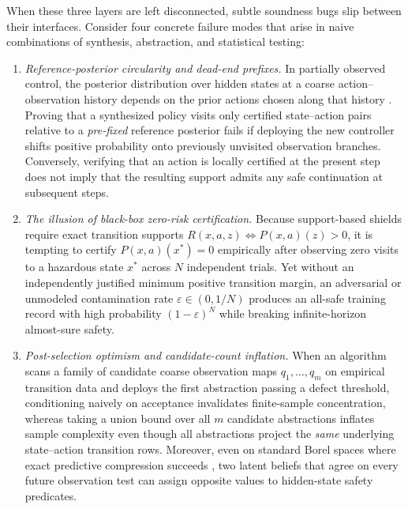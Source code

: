 \documentclass[11pt,a4paper]{article}
\providecommand{\tightlist}{\setlength{\itemsep}{2pt}\setlength{\parskip}{0pt}}
\begin{document}
When these three layers are left disconnected, subtle soundness bugs
slip between their interfaces. Consider four concrete failure modes that
arise in naive combinations of synthesis, abstraction, and statistical
testing:

\begin{enumerate}
\def\labelenumi{\arabic{enumi}.}
\tightlist
\item
  \emph{Reference-posterior circularity and dead-end prefixes.} In
  partially observed control, the posterior distribution over hidden
  states at a coarse action--observation history depends on the prior
  actions chosen along that history
  \citep{astrom1965, smallwoodSondik1973, kaelbling1998}. Proving that a
  synthesized policy visits only certified state--action pairs relative
  to a \emph{pre-fixed} reference posterior fails if deploying the new
  controller shifts positive probability onto previously unvisited
  observation branches. Conversely, verifying that an action is locally
  certified at the present step does not imply that the resulting
  support admits any safe continuation at subsequent steps.
\item
  \emph{The illusion of black-box zero-risk certification.} Because
  support-based shields require exact transition supports
  \(R(x,a,z) \iff P(x,a)(z) > 0\), it is tempting to certify
  \(P(x,a)(x^*) = 0\) empirically after observing zero visits to a
  hazardous state \(x^*\) across \(N\) independent trials. Yet without
  an independently justified minimum positive transition margin, an
  adversarial or unmodeled contamination rate
  \(\varepsilon \in (0, 1/N)\) produces an all-safe training record with
  high probability \((1-\varepsilon)^N\) while breaking infinite-horizon
  almost-sure safety.
\item
  \emph{Post-selection optimism and candidate-count inflation.} When an
  algorithm scans a family of candidate coarse observation maps
  \(q_1, \dots, q_m\) on empirical transition data and deploys the first
  abstraction passing a defect threshold, conditioning naively on
  acceptance invalidates finite-sample concentration, whereas taking a
  union bound over all \(m\) candidate abstractions inflates sample
  complexity even though all abstractions project the \emph{same}
  underlying state--action transition rows. Moreover, even on standard
  Borel spaces where exact predictive compression succeeds
  \citep{crutchfieldYoung1989, shaliziCrutchfield2001, barnettCrutchfield2015},
  two latent beliefs that agree on every future observation test can
  assign opposite values to hidden-state safety predicates.

\end{enumerate}
\end{document}
